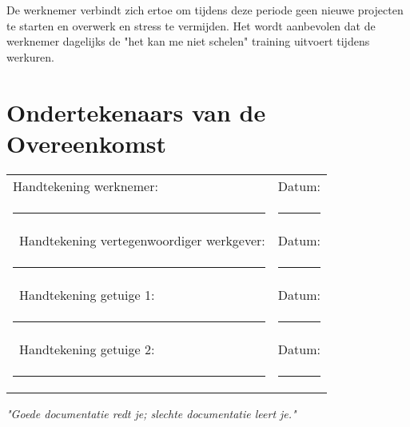 \documentclass[a4paper,11pt]{article}
\begin{document}
De werknemer verbindt zich ertoe om tijdens deze periode geen nieuwe projecten te starten en overwerk en stress te vermijden. Het wordt aanbevolen dat de werknemer dagelijks de "het kan me niet schelen" training uitvoert tijdens werkuren.

\section*{Ondertekenaars van de Overeenkomst}

\vspace{2em}
\noindent\begin{tabular}{@{}p{8cm}p{8cm}@{}}
Handtekening werknemer: & Datum: \\
\rule{8cm}{0.4pt} & \rule{8cm}{0.4pt} \\\
Handtekening vertegenwoordiger werkgever: & Datum: \\
\rule{8cm}{0.4pt} & \rule{8cm}{0.4pt} \\\
Handtekening getuige 1: & Datum: \\
\rule{8cm}{0.4pt} & \rule{8cm}{0.4pt} \\\
Handtekening getuige 2: & Datum: \\
\rule{8cm}{0.4pt} & \rule{8cm}{0.4pt}
\end{tabular}

\vfill

\begin{center}
    \textit{"Goede documentatie redt je; slechte documentatie leert je."}
\end{center}
\end{document}

